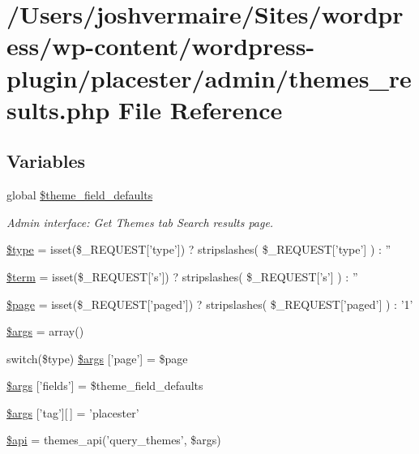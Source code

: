 \hypertarget{themes__results_8php}{
\section{/Users/joshvermaire/Sites/wordpress/wp-\/content/wordpress-\/plugin/placester/admin/themes\_\-results.php File Reference}
\label{dc/dd5/themes__results_8php}
}
\subsection*{Variables}
\begin{DoxyCompactItemize}
\item 
global \hyperlink{themes__results_8php_a6c17fd9a4fddc96f2a404e3fb642f264}{\$theme\_\-field\_\-defaults}
\begin{DoxyCompactList}\small\item\em Admin interface: Get Themes tab Search results page. \end{DoxyCompactList}\item 
\hyperlink{themes__results_8php_a9a4a6fba2208984cabb3afacadf33919}{\$type} = isset(\$\_\-REQUEST\mbox{[}'type'\mbox{]}) ? stripslashes( \$\_\-REQUEST\mbox{[}'type'\mbox{]} ) : ''
\item 
\hyperlink{themes__results_8php_aab8e9e6e6b80da234ae2c60691f73262}{\$term} = isset(\$\_\-REQUEST\mbox{[}'s'\mbox{]}) ? stripslashes( \$\_\-REQUEST\mbox{[}'s'\mbox{]} ) : ''
\item 
\hyperlink{themes__results_8php_a0a44e6760141442bb439b1ab1395d8ff}{\$page} = isset(\$\_\-REQUEST\mbox{[}'paged'\mbox{]}) ? stripslashes( \$\_\-REQUEST\mbox{[}'paged'\mbox{]} ) : '1'
\item 
\hyperlink{themes__results_8php_a67e94494731d99ed23b123e95175bc10}{\$args} = array()
\item 
switch(\$type) \hyperlink{themes__results_8php_a0f69f43fc8498682cb8f6d9b8f62f1b5}{\$args} \mbox{[}'page'\mbox{]} = \$page
\item 
\hyperlink{themes__results_8php_a1bb6ae92685ad0df0e3e1848a3b0719c}{\$args} \mbox{[}'fields'\mbox{]} = \$theme\_\-field\_\-defaults
\item 
\hyperlink{themes__results_8php_a909c74da5d237da8bbb1d99d2e57d7c5}{\$args} \mbox{[}'tag'\mbox{]}\mbox{[}$\,$\mbox{]} = 'placester'
\item 
\hyperlink{themes__results_8php_afce321e6f53c241037f871b50680cf1c}{\$api} = themes\_\-api('query\_\-themes', \$args)
\end{DoxyCompactItemize}


